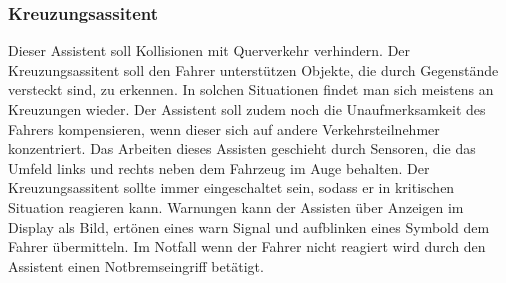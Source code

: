         \subsubsection{Kreuzungsassitent}
        Dieser Assistent soll Kollisionen mit Querverkehr verhindern. Der Kreuzungsassitent soll den Fahrer 
        unterstützen Objekte, die durch Gegenstände versteckt sind, zu erkennen. In solchen Situationen findet 
        man sich meistens an Kreuzungen wieder. Der Assistent soll zudem noch die Unaufmerksamkeit des 
        Fahrers kompensieren, wenn dieser sich auf andere Verkehrsteilnehmer konzentriert. Das Arbeiten  
        dieses Assisten geschieht durch Sensoren, die das Umfeld links und rechts neben dem Fahrzeug  im 
        Auge behalten. Der Kreuzungsassitent sollte immer eingeschaltet sein, sodass er in kritischen Situation 
        reagieren kann. Warnungen kann der Assisten über Anzeigen im Display als Bild, ertönen eines warn 
        Signal und aufblinken eines Symbold dem Fahrer übermitteln. Im Notfall wenn der Fahrer nicht 
        reagiert wird durch den Assistent einen Notbremseingriff betätigt.
        ~\cite{kreuzungsassi.PB1} ~\cite{kreuzungsassi.PB2}